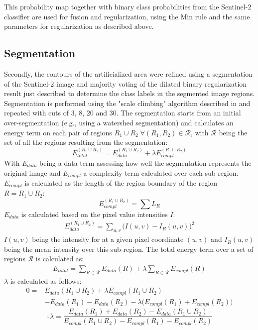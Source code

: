 \documentclass[10pt]{article}
\begin{document}
This probability map together with binary class probabilities from the Sentinel-2 classifier are used for fusion and regularization, using the Min rule and the same parameters for regularization as described above.\\

\subsection{Segmentation}
Secondly, the contours of the artificialized area were refined using a segmentation of the Sentinel-2 image and majority voting of the dilated binary regularization result just described to determine the class labels in the segmented image regions. Segmentation is performed using the "scale climbing" algorithm described in \cite{guigues_scale-sets_2003} and repeated with cuts of 3, 8, 20 and 30. The segmentation starts from an initial over-segmentation (e.g., using a watershed segmentation) and calculates an energy term on each pair of regions $R_1\cup R_2\;\forall (R_1,R_2)\in\mathcal{R}$, with $\mathcal{R}$ being the set of all the regions resulting from the segmentation:
\begin{equation}
    E_{total}^{(R_1\cup R_2)}=E_{data}^{(R_1\cup R_2)}+\lambda E_{compl}^{(R_1\cup R_2)}
\end{equation}
With $E_{data}$ being a data term assessing how well the segmentation represents the original image and $E_{compl}$ a complexity term calculated over each sub-region. $E_{compl}$ is calculated as the length of the region boundary of the region $R=R_1\cup R_2$:
\begin{equation}
    E^{(R_1\cup R_2)}_{compl}=\sum L_R
\end{equation}
$E_{data}$ is calculated based on the pixel value intensities $I$:
\begin{align}
    E_{data}^{(R_1\cup R_2)}=\sum_{u,v}\big(I(u,v)-I_R(u,v)\big)^2
\end{align}
$I(u,v)$ being the intensity for at a given pixel coordinate $(u,v)$ and $I_R(u,v)$ being the mean intensity over this sub-region. The total energy term over a set of regions $\mathcal{R}$ is calculated as:
\begin{align}
    E_{total}=\sum_{R\in \mathcal{R}} E_{data}(R)+\lambda\sum_{R\in \mathcal{R}} E_{compl}(R)
\end{align}
$\lambda$ is calculated as follows:
\begin{equation}
    \begin{split}
    0=&E_{data}(R_1\cup R_2)+\lambda E_{compl}(R_1\cup R_2)\\
    &-E_{data}(R_1)-E_{data}(R_2)-\lambda\big(E_{compl}(R_1)+E_{compl}(R_2)\big)
    \end{split}
\end{equation}
\begin{equation}
    \therefore \lambda=\frac{E_{data}(R_1)+E_{data}(R_2)-E_{data}(R_1\cup R_2)}{E_{compl}(R_1\cup R_2) -E_{compl}(R_1)-E_{compl}(R_2)}
\end{equation}
\end{document}
